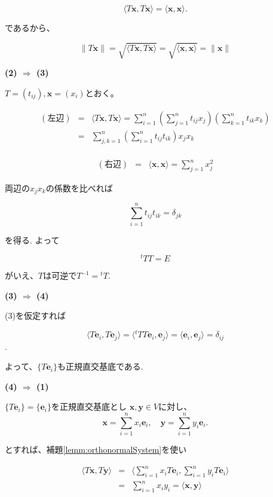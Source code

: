 \documentclass[dvipdfmx,autodetect-engine]{jsarticle}
\newcommand{\innerProduct}[2]{\langle \bm{#1}, \bm{#2} \rangle}
\newcommand{\transposeMat}[1]{{}^t\!{#1}}
\begin{document}
$$
\langle T\bm{x}, T\bm{x} \rangle = \langle \bm{x}, \bm{x} \rangle.
$$

であるから、

$$
\|T\bm{x}\| = \sqrt{\langle T\bm{x}, T\bm{x} \rangle} = \sqrt{\langle \bm{x}, \bm{x} \rangle} =\|\bm{x}\|
$$

{\bf (2) $\Rightarrow$ (3)}

$T = (t_{ij}), \bm{x} = (x_i)$とおく。


\begin{eqnarray*}
(左辺) &=& \langle T\bm{x}, T\bm{x} \rangle = \sum_{i=1}^n \left(\sum_{j=1}^n t_{ij}x_j\right) \left(\sum_{k=1}^n t_{ik}x_k\right) \\
&=& \sum_{j,k=1}^n \left(\sum_{i=1}^n t_{ij}t_{ik}\right)x_jx_k \\
\end{eqnarray*}

\begin{eqnarray*}
(右辺) &=& \langle \bm{x}, \bm{x} \rangle = \sum_{j=1}^n x_j^2
\end{eqnarray*}

両辺の$x_jx_k$の係数を比べれば

$$
\sum_{i=1}^n t_{ij}t_{ik} = \delta_{jk}
$$

を得る. よって

$$
\transposeMat{T}T = E
$$

がいえ、$T$は可逆で$T^{-1} = \transposeMat{T}$.

{\bf (3) $\Rightarrow$ (4)}

(3)を仮定すれば

$$
\langle T\bm{e}_i, T\bm{e}_j \rangle = \langle \transposeMat{T}T\bm{e}_i, \bm{e}_j \rangle = \langle \bm{e}_i, \bm{e}_j \rangle = \delta_{ij}
$$.

よって、$\{T\bm{e}_i\}$も正規直交基底である.

{\bf (4) $\Rightarrow$ (1)}

$\{T\bm{e}_i\} = \{\bm{e}_i\}$を正規直交基底とし $\bm{x}, \bm{y} \in V$に対し、
$$
\bm{x} = \sum_{i=1}^n x_i\bm{e}_i, \quad \bm{y} = \sum_{i=1}^n y_i\bm{e}_i.
$$

とすれば、補題\ref{lemm:orthonormalSystem}を使い

\begin{eqnarray*}
\langle T\bm{x}, T\bm{y} \rangle &=& \langle \sum_{i=1}^n x_iT\bm{e}_i, \sum_{i=1}^n y_iT\bm{e}_i \rangle \\
&=& \sum_{i=1}^n x_iy_i = \innerProduct{x}{y}
\end{eqnarray*}
\end{document}
